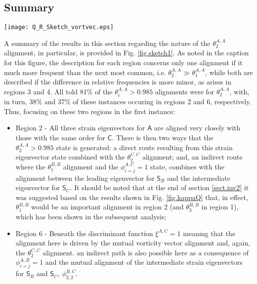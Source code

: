 \documentclass[preprint,amssymb,amsmath,aip,cha]{revtex4-1}
\begin{document}
\subsection{Summary}
\label{sect.alignsumm}
\begin{figure*}
  \texttt{[image: Q\_R\_Sketch\_vortvec.eps]}
\caption{A summary of the manner in which vorticity and strain alignments for $\mathsf{A}$, i.e. $\theta^{A,A}_{i}$ are generated in different regions of the $\mbox{Q}_{A} - \mbox{R}_{A}$ diagram. The result in the box with a border indicates how many alignments are considered in each region; if $\theta^{A,A}_{2} \gg \theta^{A,A}_{1}$, for example, then only the former is considered, while if $\theta^{A,A}_{2} > \theta^{A,A}_{1}$ both are considered.
}
\label{fig.sketch1}   
\end{figure*}
A summary of the results in this section regarding the nature of the $\theta^{A,A}_{2}$ alignment, in particular, is provided in Fig. \ref{fig.sketch1}. As noted in the caption for this figure, the description for each region concerns only one alignment if it much more frequent than the next most common, i.e. $\theta^{A,A}_{2} \gg \theta^{A,A}_{1}$, while both are described if the difference in relative frequencies is more minor, as arises in regions 3 and 4. All told 81\% of the $\theta^{A,A}_{i} > 0.985$ alignments were for $\theta^{A,A}_{2}$, with, in turn, 38\% and 37\% of these instances occuring in regions 2 and 6, respectively. Thus, focusing on these two regions in the first instance:
\begin{itemize}
\item Region 2 - All three strain eigenvectors for $\mathsf{A}$ are aligned very closely with those with the same order for $\mathsf{C}$. There is then two ways that the $\theta^{A,A}_{2} > 0.985$ state is generated: a direct route resulting from this strain eigenvector state combined with the $\theta^{C,C}_{2}$ alignment; and, an indirect route where the $\theta^{B,B}_{1}$ alignment and the $\phi^{A,C}_{i = j} = 1$ state, combines with the alignment between the leading eigenvector for $\mathsf{S}_{B}$ and the intermediate eigenvector for $\mathsf{S}_{C}$. It should be noted that at the end of section \ref{sect.inv2} it was suggested based on the results shown in Fig. \ref{fig.kappaQ} that, in effect, $\theta^{B,B}_{1}$ would be an important alignment in region 2 (and $\theta^{B,B}_{3}$ in region 1), which has been shown in the subsequent analysis;
\item Region 6 - Beneath the discriminant function $\xi^{A,C} = 1$ meaning that the alignment here is driven by the mutual vorticity vector alignment and, again, the $\theta^{C,C}_{2}$ alignment. an indirect path is also possible here as a consequence of $\phi^{A,B}_{i = j} = 1$ and the mutual alignment of the intermediate strain eigenvectors for $\mathsf{S}_{B}$ and $\mathsf{S}_{C}$, $\phi^{B,C}_{2,2}$.
\end{itemize}
\end{document}
